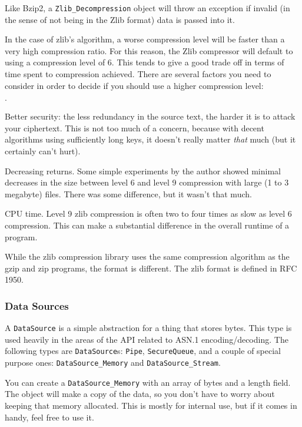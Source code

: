 \documentclass{article}
\newcommand{\type}[1]{\texttt{#1}}
\begin{document}
Like Bzip2, a \type{Zlib\_Decompression} object will throw an exception if
invalid (in the sense of not being in the Zlib format) data is passed into it.

In the case of zlib's algorithm, a worse compression level will be faster than
a very high compression ratio. For this reason, the Zlib compressor will
default to using a compression level of 6. This tends to give a good trade off
in terms of time spent to compression achieved. There are several factors you
need to consider in order to decide if you should use a higher compression
level:

\begin{list}{$\cdot$}
  \item Better security: the less redundancy in the source text, the harder it
        is to attack your ciphertext. This is not too much of a concern,
        because with decent algorithms using sufficiently long keys, it doesn't
        really matter \emph{that} much (but it certainly can't hurt).
  \item

  \item Decreasing returns. Some simple experiments by the author showed
        minimal decreases in the size between level 6 and level 9 compression
        with large (1 to 3 megabyte) files. There was some difference, but it
        wasn't that much.

  \item CPU time. Level 9 zlib compression is often two to four times as slow
        as level 6 compression. This can make a substantial difference in the
        overall runtime of a program.
\end{list}

While the zlib compression library uses the same compression algorithm as the
gzip and zip programs, the format is different. The zlib format is defined in
RFC 1950.

\subsubsection{Data Sources}

A \type{DataSource} is a simple abstraction for a thing that stores bytes. This
type is used heavily in the areas of the API related to ASN.1
encoding/decoding. The following types are \type{DataSource}s: \type{Pipe},
\type{SecureQueue}, and a couple of special purpose ones:
\type{DataSource\_Memory} and \type{DataSource\_Stream}.

You can create a \type{DataSource\_Memory} with an array of bytes and a length
field. The object will make a copy of the data, so you don't have to worry
about keeping that memory allocated. This is mostly for internal use, but if it
comes in handy, feel free to use it.
\end{document}
